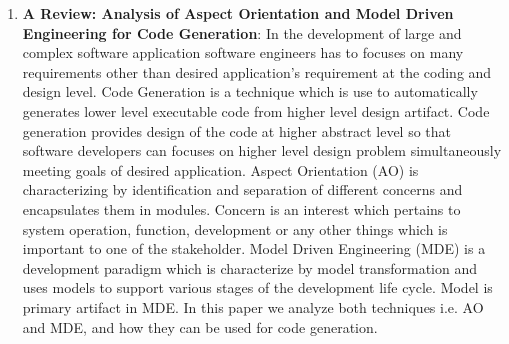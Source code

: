 \begin{englishtext}
\begin{enumerate}
    \item \textbf{A Review: Analysis of Aspect Orientation and Model Driven
    Engineering for Code Generation}: In the development of large and complex
    software application software engineers has to focuses on many requirements
    other than desired application’s requirement at the coding and design level.
    Code Generation is a technique which is use to automatically generates lower
    level executable code from higher level design artifact. Code generation
    provides design of the code at higher abstract level so that software
    developers can focuses on higher level design problem simultaneously meeting
    goals of desired application. Aspect Orientation (AO) is characterizing by
    identification and separation of different concerns and encapsulates them in
    modules. Concern is an interest which pertains to system operation,
    function, development or any other things which is important to one of the
    stakeholder. Model Driven Engineering (MDE) is a development paradigm which
    is characterize by model transformation and uses models to support various
    stages of the development life cycle. Model is primary artifact in MDE. In
    this paper we analyze both techniques i.e. AO and MDE, and how they can be
    used for code generation. \cite{aspectOrientationReview}

\end{enumerate}
\end{englishtext}


